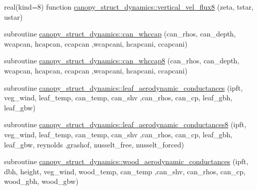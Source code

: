 \begin{DoxyCompactItemize}
\item 
real(kind=8) function \hyperlink{namespacecanopy__struct__dynamics_a146012cfe95a2719d6fbe6bf3589174d}{canopy\+\_\+struct\+\_\+dynamics\+::vertical\+\_\+vel\+\_\+flux8} (zeta, tstar, ustar)
\item 
subroutine \hyperlink{namespacecanopy__struct__dynamics_a21ac80bcc181629efe778e236edfa3b4}{canopy\+\_\+struct\+\_\+dynamics\+::can\+\_\+whccap} (can\+\_\+rhos, can\+\_\+depth, wcapcan, hcapcan, ccapcan                                                                                                                                                                                       ,wcapcani, hcapcani, ccapcani)
\item 
subroutine \hyperlink{namespacecanopy__struct__dynamics_aa8e69a84816d376ffc6d888df27932fe}{canopy\+\_\+struct\+\_\+dynamics\+::can\+\_\+whccap8} (can\+\_\+rhos, can\+\_\+depth, wcapcan, hcapcan, ccapcan                                                                                                                                                                                   ,wcapcani, hcapcani, ccapcani)
\item 
subroutine \hyperlink{namespacecanopy__struct__dynamics_a01dd30c6849ca1649aae28428c838730}{canopy\+\_\+struct\+\_\+dynamics\+::leaf\+\_\+aerodynamic\+\_\+conductances} (ipft, veg\+\_\+wind, leaf\+\_\+temp, can\+\_\+temp, can\+\_\+shv                                                                                                                                                                                               ,can\+\_\+rhos, can\+\_\+cp, leaf\+\_\+gbh, leaf\+\_\+gbw)
\item 
subroutine \hyperlink{namespacecanopy__struct__dynamics_a7cf5432807ae86932e2d3d6a0973a614}{canopy\+\_\+struct\+\_\+dynamics\+::leaf\+\_\+aerodynamic\+\_\+conductances8} (ipft, veg\+\_\+wind, leaf\+\_\+temp, can\+\_\+temp, can\+\_\+shv                                                                                                                                                                                               ,can\+\_\+rhos, can\+\_\+cp, leaf\+\_\+gbh, leaf\+\_\+gbw, reynolds                                                                                                                                                                                       ,grashof, nusselt\+\_\+free, nusselt\+\_\+forced)
\item 
subroutine \hyperlink{namespacecanopy__struct__dynamics_a6cab5b6e950a0bf9da7ef1bee0b5c4ad}{canopy\+\_\+struct\+\_\+dynamics\+::wood\+\_\+aerodynamic\+\_\+conductances} (ipft, dbh, height, veg\+\_\+wind, wood\+\_\+temp, can\+\_\+temp                                                                                                                                                                                   ,can\+\_\+shv, can\+\_\+rhos, can\+\_\+cp, wood\+\_\+gbh, wood\+\_\+gbw)

\end{DoxyCompactItemize}
